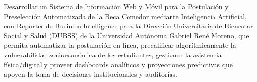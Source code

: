 Desarrollar un Sistema de Información Web y Móvil para la Postulación y Preselección Automatizada de la Beca Comedor mediante Inteligencia Artificial, con Reportes de Business Intelligence para la Dirección Universitaria de Bienestar Social y Salud (DUBSS) de la Universidad Autónoma Gabriel René Moreno, que permita automatizar la postulación en línea, precalificar algorítmicamente la vulnerabilidad socioeconómica de los estudiantes, gestionar la asistencia física/digital y proveer dashboards analíticos y proyecciones predictivas que apoyen la toma de decisiones institucionales y auditorías.
